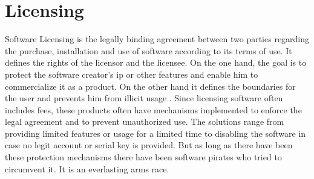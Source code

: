 \section{Licensing} \label{section:introduction-licensing}
Software Licensing is the legally binding agreement between two parties regarding the purchase, installation and use of software according to its terms of use.
It defines the rights of the licensor and the licensee.
On the one hand, the goal is to protect the software creator's \gls{ip} or other features and enable him to commercialize it as a product.
On the other hand it defines the boundaries for the user and prevents him from illicit usage \cite{uncgLicensing}.
\newline
\newline
Since licensing software often includes fees, these products often have mechanisms implemented to enforce the legal agreement and to prevent unauthorized use.
The solutions range from providing limited features or usage for a limited time to disabling the software in case no legit account or serial key is provided.
\newline
\newline
But as long as there have been these protection mechanisms there have been software pirates who tried to circumvent it. It is an everlasting arms race\cite{szCopy}.


%

%

%
%

%
%



